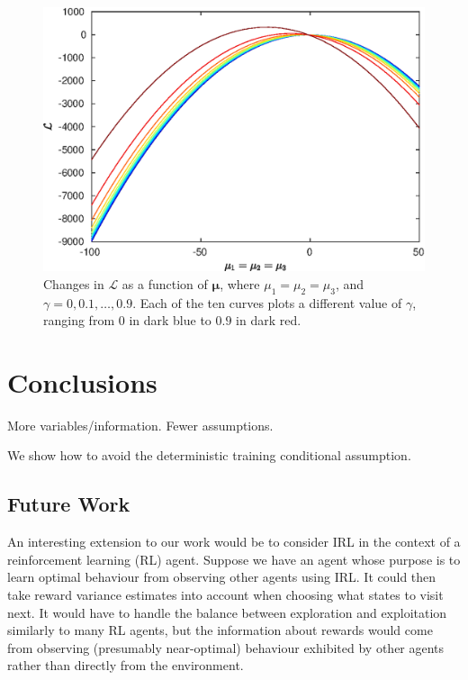 \documentclass{mpaper}
\begin{document}
\begin{figure}
  \centering
  \includegraphics[width=\columnwidth]{elbo_over_gamma}
  \caption{Changes in $\mathcal{L}$ as a function of $\bm\mu$, where $\mu_1 =
    \mu_2 = \mu_3$, and $\gamma = 0, 0.1, \dots, 0.9$. Each of the ten curves
    plots a different value of $\gamma$, ranging from $0$ in dark blue to $0.9$
    in dark red.}
\end{figure}

\section{Conclusions}

More variables/information. Fewer assumptions.

We show how to avoid the deterministic training conditional assumption.

\subsection{Future Work}

An interesting extension to our work would be to consider IRL in the context
of a reinforcement learning (RL) agent. Suppose we have an agent whose purpose
is to learn optimal behaviour from observing other agents using IRL. It could
then take reward variance estimates into account when choosing what states to
visit next. It would have to handle the balance between exploration and
exploitation similarly to many RL agents, but the information about rewards
would come from observing (presumably near-optimal) behaviour exhibited by other
agents rather than directly from the environment.
\end{document}
